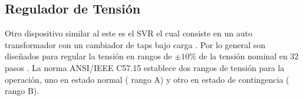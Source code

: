 \documentclass[12pt, letterpaper]{report}
\begin{document}

\subsection{Regulador de Tensión}
Otro dispositivo similar al este es el \ac{SVR} el cual consiste en un auto transformador con un cambiador de taps  bajo carga \cite{Vkdulqj}. Por lo general son diseñados para regular la tensión en rangos de $\pm 10 \%$ de la tensión nominal en 32 pasos \cite{kersting2009modeling} \cite{farag2012incorporating}. La norma ANSI/IEEE C57.15 establece dos rangos de tensión para la operación, uno en estado normal ( rango A) y otro en estado de contingencia ( rango B).
\end{document}
